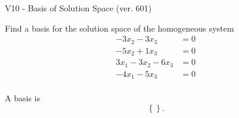 \begin{exercise}
  \begin{exerciseTitle}V10 - Basis of Solution Space (ver. 601)\end{exerciseTitle}
  \begin{exerciseStatement}
    Find a basis for the solution space of the homogeneous system 
\begin{align*}
 -3 x_ 2 -3 x_ 3 &= 0  \\ 
  -5 x_ 2 + 1 x_ 3 &= 0  \\ 
  3 x_ 1 -3 x_ 2 -6 x_ 3 &= 0  \\ 
  -4 x_ 1 -5 x_ 3 &= 0  \\ 
 \end{align*}


 
  \end{exerciseStatement}

  \begin{exerciseAnswer}
   A basis is   
\[\left\{\right\}.\]

  


  \end{exerciseAnswer}
\end{exercise}